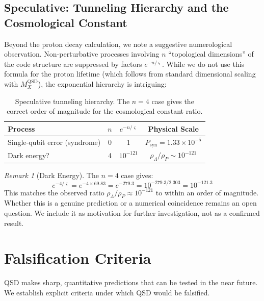 \documentclass[11pt,a4paper]{article}
\theoremstyle{definition}
\theoremstyle{remark}
\newtheorem{remark}[theorem]{Remark}
\newcommand{\strain}{\varsigma}
\newcommand{\MX}{{M_X^{\mathrm{QSD}}}}
\newcommand{\Psyn}{P_{\mathrm{syn}}}
\begin{document}
\subsection{Speculative: Tunneling Hierarchy and the Cosmological Constant}

Beyond the proton decay calculation, we note a suggestive numerological observation. Non-perturbative processes involving $n$ ``topological dimensions'' of the code structure are suppressed by factors $e^{-n/\strain}$. While we do not use this formula for the proton lifetime (which follows from standard dimensional scaling with $\MX$), the exponential hierarchy is intriguing:

\begin{table}[H]
\centering
\begin{tabular}{lccc}
\toprule
\textbf{Process} & \textbf{$n$} & \textbf{$e^{-n/\strain}$} & \textbf{Physical Scale} \\
\midrule
Single-qubit error (syndrome) & 0 & 1 & $\Psyn = 1.33 \times 10^{-5}$ \\
Dark energy? & 4 & $10^{-121}$ & $\rho_\Lambda/\rho_P \sim 10^{-121}$ \\
\bottomrule
\end{tabular}
\caption{Speculative tunneling hierarchy. The $n=4$ case gives the correct order of magnitude for the cosmological constant ratio.}
\label{tab:tunneling_spec}
\end{table}

\begin{remark}[Dark Energy]
The $n=4$ case gives:
\begin{equation}
e^{-4/\strain} = e^{-4 \times 69.83} = e^{-279.3} = 10^{-279.3/2.303} = 10^{-121.3}
\end{equation}
This matches the observed ratio $\rho_\Lambda/\rho_P \approx 10^{-121}$ to within an order of magnitude. Whether this is a genuine prediction or a numerical coincidence remains an open question. We include it as motivation for further investigation, not as a confirmed result.
\end{remark}

\section{Falsification Criteria}
\label{sec:falsification}

QSD makes sharp, quantitative predictions that can be tested in the near future. We establish explicit criteria under which QSD would be falsified.
\end{document}
